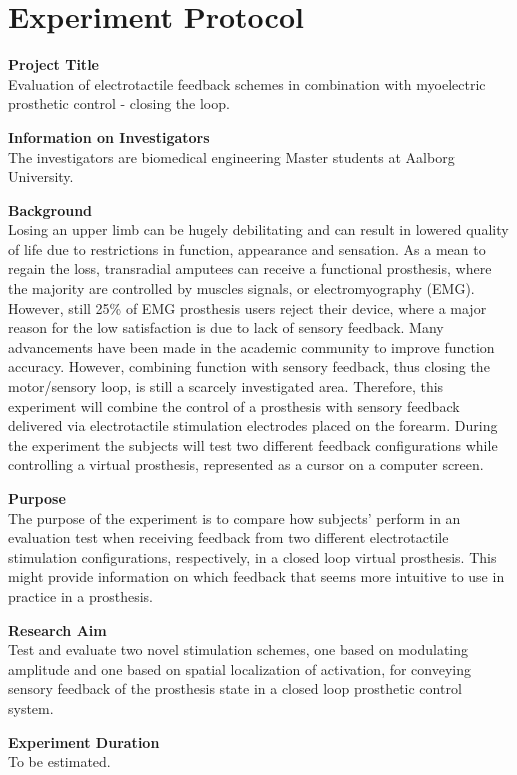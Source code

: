 \section{Experiment Protocol}

\textbf{Project Title} \\
Evaluation of electrotactile feedback schemes in combination with myoelectric prosthetic control - closing the loop. 

\textbf{Information on Investigators} \\
The investigators are biomedical engineering Master students at Aalborg University. 

\textbf{Background} \\
Losing an upper limb can be hugely debilitating and can result in lowered quality of life due to restrictions in function, appearance and sensation. As a mean to regain the loss, transradial amputees can receive a functional prosthesis, where the majority are controlled by muscles signals, or electromyography (EMG). However, still 25\% of EMG prosthesis users reject their device, where a major reason for the low satisfaction is due to lack of sensory feedback.
Many advancements have been made in the academic community to improve function accuracy. However, combining function with sensory feedback, thus closing the motor/sensory loop, is still a scarcely investigated area. Therefore, this experiment will combine the control of a prosthesis with sensory feedback delivered via electrotactile stimulation electrodes placed on the forearm. During the experiment the subjects will test two different feedback configurations while controlling a virtual prosthesis, represented as a cursor on a computer screen.  

\textbf{Purpose} \\
The purpose of the experiment is to compare how subjects' perform in an evaluation test when receiving feedback from two different electrotactile stimulation configurations, respectively, in a closed loop virtual prosthesis. This might provide information on which feedback that seems more intuitive to use in practice in a prosthesis.


\textbf{Research Aim} \\
Test and evaluate two novel stimulation schemes, one based on modulating amplitude and one based on spatial localization of activation, for conveying sensory feedback of the prosthesis state in a closed loop prosthetic control system.

\textbf{Experiment Duration} \\
To be estimated.


